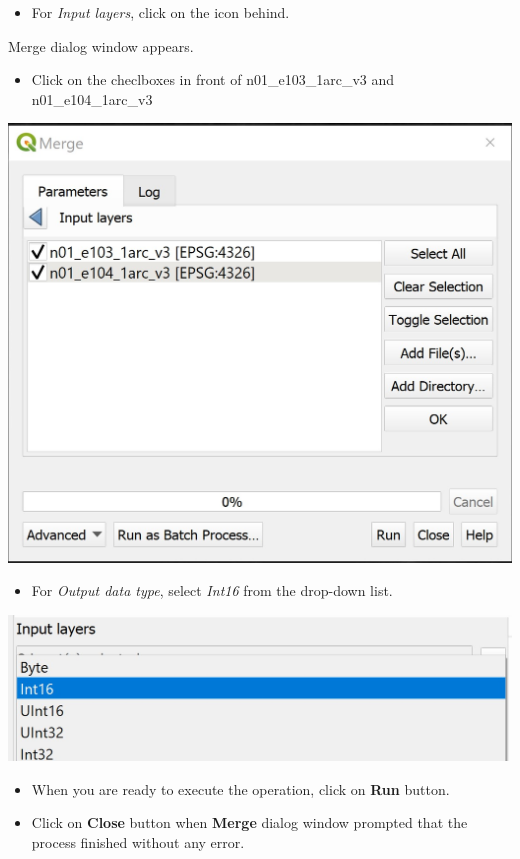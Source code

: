 \documentclass[
  letterpaper,
  DIV=11,
  numbers=noendperiod]{scrreprt}
\providecommand{\tightlist}{%
  \setlength{\itemsep}{0pt}\setlength{\parskip}{0pt}}\usepackage{longtable,booktabs,array}
\begin{document}
\begin{itemize}
\tightlist
\item
  For \emph{Input layers}, click on the icon behind.
\end{itemize}

Merge dialog window appears.

\begin{itemize}
\tightlist
\item
  Click on the checlboxes in front of n01\_e103\_1arc\_v3 and
  n01\_e104\_1arc\_v3
\end{itemize}

\includegraphics{./img06/image39.jpg}

\begin{itemize}
\tightlist
\item
  For \emph{Output data type}, select \emph{Int16} from the drop-down
  list.
\end{itemize}

\includegraphics{./img06/image40.jpg}

\begin{itemize}
\item
  When you are ready to execute the operation, click on \textbf{Run}
  button.
\item
  Click on \textbf{Close} button when \textbf{Merge} dialog window
  prompted that the process finished without any error.
\end{itemize}
\end{document}

